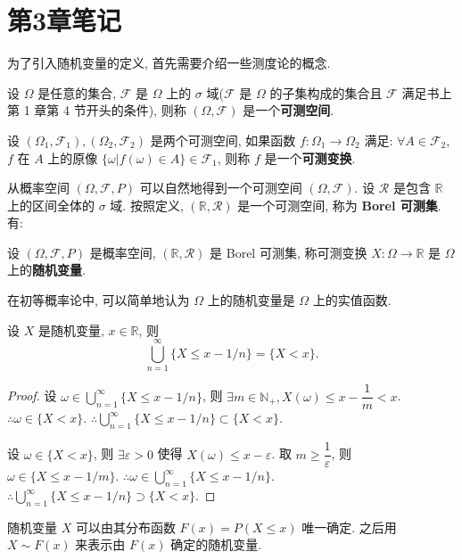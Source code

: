 \documentclass[color=black,device=normal,lang=cn]{elegantnote}
\numberwithin{equation}{section}
\theoremstyle{plain}
\numberwithin{exercise}{exsection}
\begin{document}
\section{第3章笔记}
为了引入随机变量的定义, 首先需要介绍一些测度论的概念.
\begin{definition}
    设 $\Omega$ 是任意的集合, $\mathcal{F}$ 是 $\Omega$ 上的 $\sigma$ 域($\mathcal{F}$ 是 $\Omega$ 的子集构成的集合且 $\mathcal{F}$ 满足书上第 1 章第 4 节开头的条件), 则称 $(\Omega,\mathcal{F})$ 是一个\textbf{可测空间}.
\end{definition}
\begin{definition}
    设 $(\Omega_1,\mathcal{F}_1),(\Omega_2,\mathcal{F}_2)$ 是两个可测空间, 如果函数 $f:\Omega_1\to\Omega_2$ 满足: $\forall A\in\mathcal{F}_2$, $f$ 在 $A$ 上的原像 $\{\omega|f(\omega)\in A\}\in\mathcal{F}_1$, 则称 $f$ 是一个\textbf{可测变换}.
\end{definition}

从概率空间 $(\Omega,\mathcal{F},P)$ 可以自然地得到一个可测空间 $(\Omega,\mathcal{F})$. 设 $\mathcal{R}$ 是包含 $\mathbb{R}$ 上的区间全体的 $\sigma$ 域. 按照定义, $(\mathbb{R},\mathcal{R})$ 是一个可测空间, 称为 \textbf{Borel 可测集}. 有:
\begin{definition}
    设 $(\Omega,\mathcal{F},P)$ 是概率空间, $(\mathbb{R},\mathcal{R})$ 是 Borel 可测集, 称可测变换 $X:\Omega\to\mathbb{R}$ 是 $\Omega$ 上的\textbf{随机变量}.
\end{definition}

在初等概率论中, 可以简单地认为 $\Omega$ 上的随机变量是 $\Omega$ 上的实值函数.
\begin{example}[书上的例 1.3(2)]
    设 $X$ 是随机变量, $x\in\mathbb{R}$, 则
    \[\bigcup\limits_{n=1}^\infty\{X\leq x-1/n\}=\{X<x\}.\]
\end{example}
\begin{proof}
    设 $\omega\in\bigcup\limits_{n=1}^\infty\{X\leq x-1/n\}$, 则 $\exists m\in\mathbb{N}_+,X(\omega)\leq x-\dfrac{1}{m}<x$. $\therefore\omega\in\{X<x\}$. $\therefore\bigcup\limits_{n=1}^\infty\{X\leq x-1/n\}\subset\{X<x\}$.

    设 $\omega\in\{X<x\}$, 则 $\exists\varepsilon>0$ 使得 $X(\omega)\leq x-\varepsilon$. 取 $m\geq\dfrac{1}{\varepsilon}$, 则 $\omega\in\{X\leq x-1/m\}$. $\therefore\omega\in\bigcup\limits_{n=1}^\infty\{X\leq x-1/n\}$. $\therefore\bigcup\limits_{n=1}^\infty\{X\leq x-1/n\}\supset\{X<x\}$.
\end{proof}

随机变量 $X$ 可以由其分布函数 $F(x)=P(X\leq x)$ 唯一确定. 之后用 $X\sim F(x)$ 来表示由 $F(x)$ 确定的随机变量.
\end{document}
